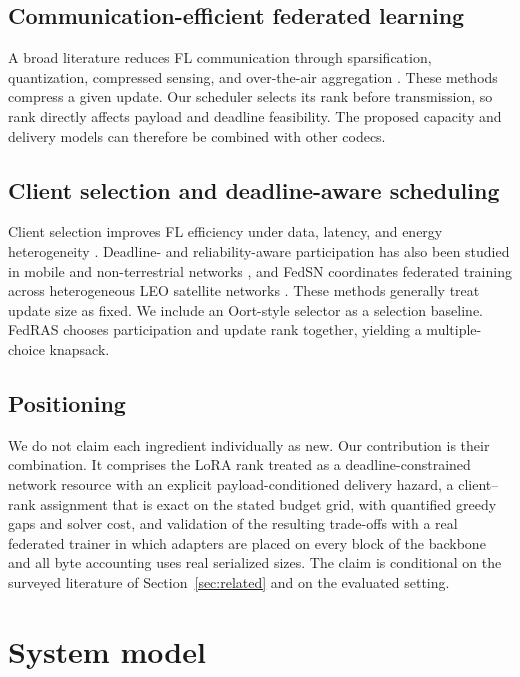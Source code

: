 \documentclass[preprint,12pt]{elsarticle}
\begin{document}
\subsection{Communication-efficient federated learning}
A broad literature reduces FL communication through sparsification, quantization, compressed sensing, and over-the-air aggregation \cite{oh2023fedqcs,oh2024fedvqcs,liu2023adaptivequant,kim2023beamforming,reisizadeh2020fedpaq,lin2018deep}. These methods compress a given update. Our scheduler selects its rank before transmission, so rank directly affects payload and deadline feasibility. The proposed capacity and delivery models can therefore be combined with other codecs.

\subsection{Client selection and deadline-aware scheduling}
Client selection improves FL efficiency under data, latency, and energy heterogeneity \cite{oort2021oort,chen2024clientselection,dong2024aoi,luo2021costeffective}. Deadline- and reliability-aware participation has also been studied in mobile and non-terrestrial networks \cite{razmi2022ground,tang2023flsagin,qin2024dfrl,ribero2023intermittent,han2024orchestrating}, and FedSN coordinates federated training across heterogeneous LEO satellite networks \cite{lin2025fedsn}. These methods generally treat update size as fixed. We include an Oort-style selector as a selection baseline. FedRAS chooses participation and update rank together, yielding a multiple-choice knapsack.

\subsection{Positioning}
We do not claim each ingredient individually as new. Our contribution is their combination. It comprises the LoRA rank treated as a deadline-constrained network resource with an explicit payload-conditioned delivery hazard, a client--rank assignment that is exact on the stated budget grid, with quantified greedy gaps and solver cost, and validation of the resulting trade-offs with a real federated trainer in which adapters are placed on every block of the backbone and all byte accounting uses real serialized sizes. The claim is conditional on the surveyed literature of Section~\ref{sec:related} and on the evaluated setting.

\section{System model}
\label{sec:model}
\end{document}
